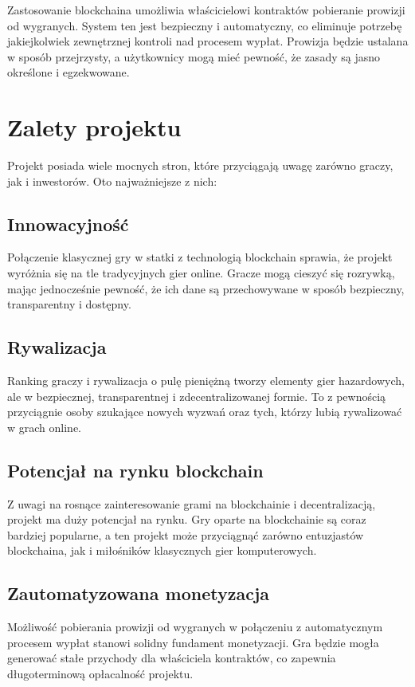 \documentclass{article}
\begin{document}
Zastosowanie blockchaina umożliwia właścicielowi kontraktów pobieranie prowizji od wygranych. System ten jest bezpieczny i automatyczny, co eliminuje potrzebę jakiejkolwiek zewnętrznej kontroli nad procesem wypłat. Prowizja będzie ustalana w sposób przejrzysty, a użytkownicy mogą mieć pewność, że zasady są jasno określone i egzekwowane.

\section{Zalety projektu}

Projekt posiada wiele mocnych stron, które przyciągają uwagę zarówno graczy, jak i inwestorów. Oto najważniejsze z nich:

\subsection{Innowacyjność}

Połączenie klasycznej gry w statki z technologią blockchain sprawia, że projekt wyróżnia się na tle tradycyjnych gier online. Gracze mogą cieszyć się rozrywką, mając jednocześnie pewność, że ich dane są przechowywane w sposób bezpieczny, transparentny i dostępny.

\subsection{Rywalizacja}

Ranking graczy i rywalizacja o pulę pieniężną tworzy elementy gier hazardowych, ale w bezpiecznej, transparentnej i zdecentralizowanej formie. To z pewnością przyciągnie osoby szukające nowych wyzwań oraz tych, którzy lubią rywalizować w grach online.

\subsection{Potencjał na rynku blockchain}
Z uwagi na rosnące zainteresowanie grami na blockchainie i decentralizacją, projekt ma duży potencjał na rynku. Gry oparte na blockchainie są coraz bardziej popularne, a ten projekt może przyciągnąć zarówno entuzjastów blockchaina, jak i miłośników klasycznych gier komputerowych.

\subsection{Zautomatyzowana monetyzacja}

Możliwość pobierania prowizji od wygranych w połączeniu z automatycznym procesem wypłat stanowi solidny fundament monetyzacji. Gra będzie mogła generować stałe przychody dla właściciela kontraktów, co zapewnia długoterminową opłacalność projektu.
\end{document}
